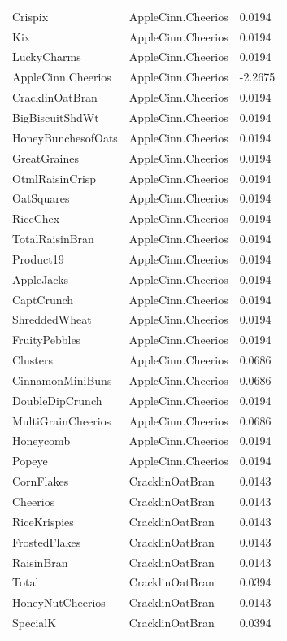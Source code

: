 \begin{table}[!htbp]
\begin{tabular}{lll}
Crispix & AppleCinn.Cheerios & 0.0194
\\
Kix & AppleCinn.Cheerios & 0.0194
\\
LuckyCharms & AppleCinn.Cheerios & 0.0194
\\
AppleCinn.Cheerios & AppleCinn.Cheerios & -2.2675
\\
CracklinOatBran & AppleCinn.Cheerios & 0.0194
\\
BigBiscuitShdWt & AppleCinn.Cheerios & 0.0194
\\
HoneyBunchesofOats & AppleCinn.Cheerios & 0.0194
\\
GreatGraines & AppleCinn.Cheerios & 0.0194
\\
OtmlRaisinCrisp & AppleCinn.Cheerios & 0.0194
\\
OatSquares & AppleCinn.Cheerios & 0.0194
\\
RiceChex & AppleCinn.Cheerios & 0.0194
\\
TotalRaisinBran & AppleCinn.Cheerios & 0.0194
\\
Product19 & AppleCinn.Cheerios & 0.0194
\\
AppleJacks & AppleCinn.Cheerios & 0.0194
\\
CaptCrunch & AppleCinn.Cheerios & 0.0194
\\
ShreddedWheat & AppleCinn.Cheerios & 0.0194
\\
FruityPebbles & AppleCinn.Cheerios & 0.0194
\\
Clusters & AppleCinn.Cheerios & 0.0686
\\
CinnamonMiniBuns & AppleCinn.Cheerios & 0.0686
\\
DoubleDipCrunch & AppleCinn.Cheerios & 0.0194
\\
MultiGrainCheerios & AppleCinn.Cheerios & 0.0686
\\
Honeycomb & AppleCinn.Cheerios & 0.0194
\\
Popeye & AppleCinn.Cheerios & 0.0194
\\
CornFlakes & CracklinOatBran & 0.0143
\\
Cheerios & CracklinOatBran & 0.0143
\\
RiceKrispies & CracklinOatBran & 0.0143
\\
FrostedFlakes & CracklinOatBran & 0.0143
\\
RaisinBran & CracklinOatBran & 0.0143
\\
Total & CracklinOatBran & 0.0394
\\
HoneyNutCheerios & CracklinOatBran & 0.0143
\\
SpecialK & CracklinOatBran & 0.0394
\\

\end{tabular}
\end{table}
